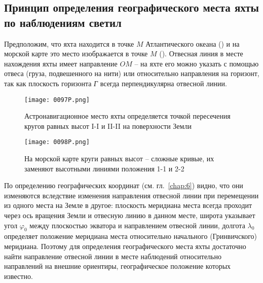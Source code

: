\subsection{Принцип определения географического места яхты по наблюдениям
  светил}

Предположим, что яхта находится в точке $M$ Атлантического
океана () и на морской карте это место изображается в точке
$M$ ().  Отвесная линия в месте нахождения яхты имеет
направление $OM$ \--- на яхте его можно указать с помощью отвеса (груза,
подвешенного на нити) или относительно направления на горизонт, так
как плоскость горизонта \textit{Г} всегда перпендикулярна отвесной линии.

\begin{figure}[!htb]
  \centering
  \texttt{[image: 0097P.png]}
  \caption[Астронавигационное место яхты]{Астронавигационное место яхты определяется точкой пересечения кругов равных высот I-I и II-II на поверхности Земли}
  \label{fig:97}
\end{figure}

\begin{figure*}[!htb]
  \centering
  \texttt{[image: 0098P.png]}
  \caption[Круги равных высот на морской карте]{На морской карте круги равных высот \--- сложные кривые, их заменяют высотными линиями положения 1-1 и 2-2}
  \label{fig:98}
\end{figure*}

По определению географических координат (см. гл.~\ref{chap:6}) видно,
что они изменяются вследствие изменения направления отвесной линии при
перемещении из одного места на Земле в другое: плоскость меридиана
места всегда проходит через ось вращения Земли и отвесную линию в
данном месте, широта указывает угол $\varphi_0$ между плоскостью
экватора и направлением отвесной линии, долгота $\lambda_0$ определяет
положение меридиана места относительно начального (Гринвичского)
меридиана. Поэтому для определения географического места яхты достаточно
найти направление отвесной линии в месте наблюдений относительно
направлений на внешние ориентиры, географическое положение которых
известно.

